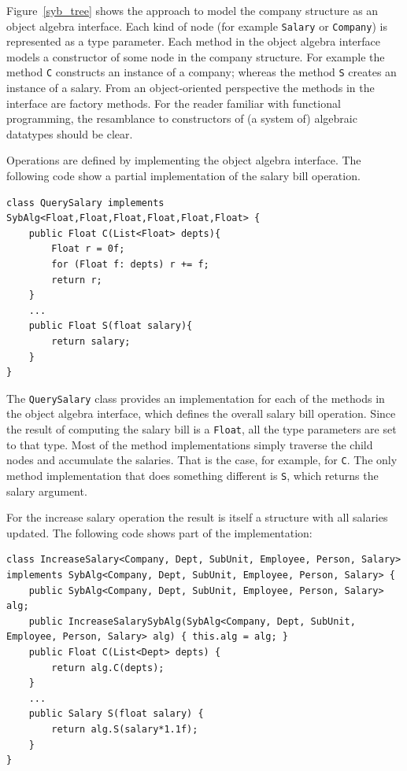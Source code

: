 Figure~\ref{syb_tree} shows the approach to model the company
structure as an object algebra interface. Each kind of node (for
example \lstinline{Salary} or \lstinline{Company}) is represented as a
type parameter. Each method in the object algebra interface models a
constructor of some node in the company structure. For example the
method \lstinline{C} constructs an instance of a company; whereas the
method \lstinline{S} creates an instance of a salary. From an
object-oriented perspective the methods in the interface are factory
methods. For the reader familiar with functional programming, the
resamblance to constructors of  (a system of) algebraic datatypes should be clear.

Operations are defined by implementing the object algebra interface.
The following code show a partial implementation of the salary bill
operation.

\begin{lstlisting}[numbers=none] 
class QuerySalary implements SybAlg<Float,Float,Float,Float,Float,Float> {
	public Float C(List<Float> depts){
		Float r = 0f;
		for (Float f: depts) r += f;
		return r;
	}
	...
	public Float S(float salary){
		return salary;
	}
}
\end{lstlisting}

The \lstinline{QuerySalary} class provides an implementation for each
of the methods in the object algebra interface, which defines the
overall salary bill operation. Since the result of computing the
salary bill is a \lstinline{Float}, all the type parameters are set to
that type. Most of the method implementations simply traverse the
child nodes and accumulate the salaries. That is the case, for
example, for \lstinline{C}. The only method implementation that does
something different is \lstinline{S}, which returns the salary
argument. 

For the increase salary operation the result is itself a structure
with all salaries updated. The following code shows part of the 
implementation:

\begin{lstlisting}[numbers=none]
class IncreaseSalary<Company, Dept, SubUnit, Employee, Person, Salary> implements SybAlg<Company, Dept, SubUnit, Employee, Person, Salary> {
	public SybAlg<Company, Dept, SubUnit, Employee, Person, Salary> alg;
	public IncreaseSalarySybAlg(SybAlg<Company, Dept, SubUnit, Employee, Person, Salary> alg) { this.alg = alg; }
	public Float C(List<Dept> depts) {
		return alg.C(depts);
	}
	...
	public Salary S(float salary) {
		return alg.S(salary*1.1f);
	}
}
\end{lstlisting}

